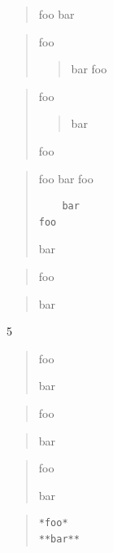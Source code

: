
\def\mytitle{Blockquotes}


\begin{quote}
foo
bar
\end{quote}

\begin{quote}
foo

\begin{quote}
bar
foo
\end{quote}
\end{quote}

\begin{quote}
foo

\begin{quote}
bar
\end{quote}

foo
\end{quote}

\begin{quote}
foo
bar
foo

\begin{verbatim}
	bar
foo
\end{verbatim}

bar
\end{quote}

\begin{quote}
foo
\end{quote}

\begin{quote}
bar
\end{quote}

5

\begin{quote}
foo

bar
\end{quote}

\begin{quote}
foo
\end{quote}

\begin{quote}
bar
\end{quote}

\begin{quote}
foo

bar
\end{quote}

\begin{quote}
\begin{verbatim}
*foo*
**bar**
\end{verbatim}
\end{quote}

